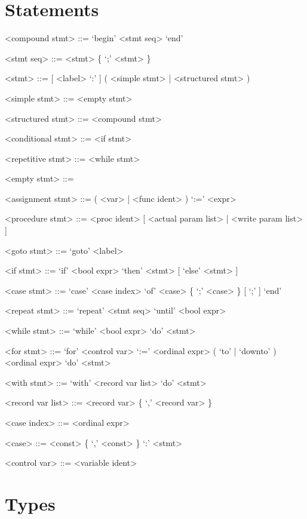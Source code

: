 \documentclass{article}
\begin{document}
\section{Statements}

{
  \begin{grammar}
    <compound stmt> ::= `begin' <stmt seq> `end'

    <stmt seq> ::= <stmt> \{ `;' <stmt> \}

    <stmt> ::= [ <label> `:' ] ( <simple stmt> | <structured stmt> )

    <simple stmt> ::= <empty stmt>   

    <structured stmt> ::= <compound stmt>   

    <conditional stmt> ::= <if stmt> 

    <repetitive stmt> ::= <while stmt>  

    <empty stmt> ::= \hphantom{}

    <assignment stmt> ::= ( <var> | <func ident> ) `:=' <expr>

    <procedure stmt> ::= <proc ident> [ <actual param list> | <write param list> ]

    <goto stmt> ::= `goto' <label>

    <if stmt> ::= `if' <bool expr> `then' <stmt> [ `else' <stmt> ]

    <case stmt> ::= `case' <case index> `of' <case> \{ `;' <case> \} [ `;' ] `end'

    <repeat stmt> ::= `repeat' <stmt seq> `until' <bool expr>

    <while stmt> ::= `while' <bool expr> `do' <stmt>

    <for stmt> ::= `for' <control var> `:=' <ordinal expr> ( `to' | `downto' ) \\
    <ordinal expr> `do' <stmt>

    <with stmt> ::= `with' <record var list> `do' <stmt>

    <record var list> ::= <record var> \{ `,' <record var> \}

    <case index> ::= <ordinal expr>

    <case> ::= <const> \{ `,' <const> \} `:' <stmt>

    <control var> ::= <variable ident>
  \end{grammar}
}

\section{Types}
\end{document}
